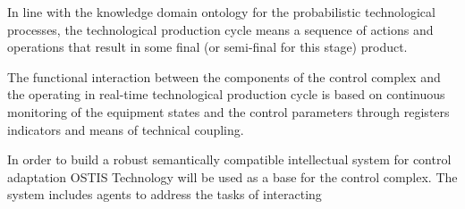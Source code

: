 \documentclass{article}
\begin{document}
\begin{minipage}[t]{0.45\textwidth}
    \vspace{0.4\baselineskip} \hspace{0.2cm} In line with the knowledge domain ontology for the probabilistic technological processes, the technological production cycle means a sequence of actions and operations that result in some final (or semi-final for this stage) product.

    \hspace{0.2cm} The functional interaction between the components of the control complex and the operating in real-time technological production cycle is based on continuous monitoring of the equipment states and the control parameters through registers indicators and means of technical coupling.

    \hspace{0.2cm} In order to build a robust semantically compatible intellectual system for control adaptation OSTIS Technology will be used as a base for the control complex. The system includes agents to address the tasks of interacting

    
\end{minipage}
\hspace{0.2cm} 
\end{document}

